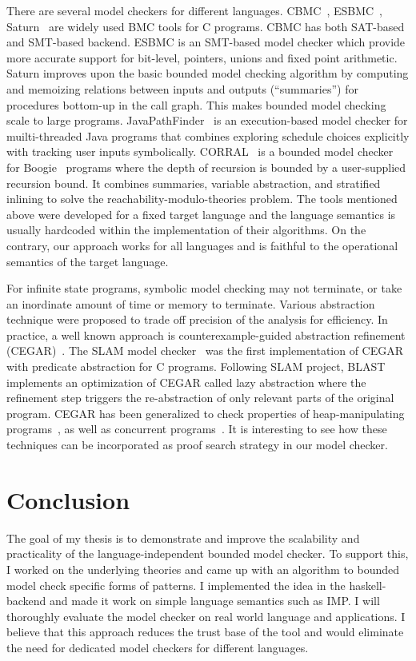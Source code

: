 \documentclass{almostllncs}
\begin{document}
There are several model checkers for different languages.
CBMC~\cite{Clarke2004ATF}, ESBMC~\cite{ESBMC},  Saturn~\cite{DBLP:conf/popl/XieA05} are widely used BMC tools for C programs.
CBMC has both SAT-based and SMT-based backend.
ESBMC is an SMT-based model checker which provide more accurate support for bit-level, pointers, unions and fixed point arithmetic.
Saturn improves upon the basic bounded model checking algorithm by computing and memoizing relations between inputs and outputs (“summaries”) for procedures bottom-up in the call graph.
This makes bounded model checking scale to large programs.
JavaPathFinder~\cite{Havelund2000} is an execution-based model checker for muilti-threaded Java programs that combines exploring schedule choices explicitly with tracking user inputs symbolically.
CORRAL~\cite{corral-a-solver-for-reachability-modulo-theories-2} is a bounded model checker for Boogie~\cite{boogie} programs where the depth of recursion is bounded by a user-supplied recursion bound.
It combines summaries, variable abstraction, and stratified inlining to solve the
reachability-modulo-theories problem.
The tools mentioned above were developed for a fixed target language and the language semantics is usually hardcoded within the implementation of their algorithms.
On the contrary, our approach works for all languages and is faithful to the operational semantics of the target language.

For infinite state programs, symbolic model checking may not terminate, or take
an inordinate amount of time or memory to terminate.
Various abstraction technique were proposed to trade off precision of the analysis for efficiency.
In practice, a well known approach is counterexample-guided abstraction refinement (CEGAR)~\cite{CEGR}.
The SLAM model checker~\cite{SLAM} was the first implementation of CEGAR with predicate abstraction for C programs.
Following SLAM project, BLAST~\cite{Henzinger:2002:LA:503272.503279} implements an optimization of CEGAR called lazy abstraction where the refinement step triggers the re-abstraction of only relevant parts of the original program.
CEGAR has been generalized to check properties of heap-manipulating programs~\cite{10.1007/978-3-642-12029-9_19}, as well as concurrent programs~\cite{Chaki:2003:MVS:776816.776863}.
It is interesting to see how these techniques can be incorporated as proof search strategy in our model checker.

\section{Conclusion}
The goal of my thesis is to demonstrate and improve the scalability and
practicality of the language-independent bounded model checker.
To support this, I worked on the underlying theories and came up with an algorithm to bounded model check specific forms of \modmul patterns.
I implemented the idea in the \K haskell-backend and made it work on simple language semantics such as IMP.
I will thoroughly evaluate the model checker on real world language and applications.
I believe that this approach reduces the trust base of the tool and would eliminate the need for dedicated model checkers for different languages.



\end{document}
